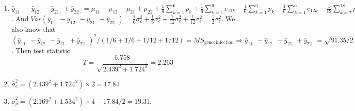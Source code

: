 \documentclass{article}
\begin{document}
\begin{enumerate}[leftmargin = 0 em, label = \arabic*., font = \bfseries]
\begin{enumerate}
		\item 
		$\bar{y}_{11 \cdot} - \bar{y}_{12 \cdot} - \bar{y}_{21 \cdot} + \bar{y}_{22 \cdot} = \mu_{11} - \mu_{12} - \mu_{21} + \mu_{22} + \frac{1}{6} \sum_{k=1}^6 p_k + \frac{1}{6}\sum_{k=1}^6 e_{11k} - \frac{1}{6} \sum_{k=1}^6 p_k - \frac{1}{6} \sum_{k=1}^6 e_{12k} - \frac{1}{12} \sum_{k=7}^{18} p_k - \frac{1}{12} e_{21k} + \frac{1}{12} \sum_{k=7}^18 p_k + \frac{1}{12} \sum_{k=7}^{18} e_{22k} = \mu_{11} - \mu_{12} - \mu_{21} + \mu_{22} + \bar{e}_{11 \cdot} - \bar{e}_{12 \cdot} - \bar{e}_{21 \cdot} + \bar{e}_{22 \cdot}$. And $Var(\bar{y}_{11 \cdot} - \bar{y}_{12 \cdot} - \bar{y}_{21 \cdot} + \bar{y}_{22 \cdot}) = \frac{1}{6} \sigma_e^2 + \frac{1}{6} \sigma_e^2 + \frac{1}{12} \sigma_{e}^2 + \frac{1}{12} \sigma_e^2 = \frac{1}{2} \sigma_e^2$. We also know that $(\bar{y}_{11 \cdot} - \bar{y}_{12 \cdot} - \bar{y}_{21 \cdot} + \bar{y}_{22 \cdot})^2/(1/6 + 1/6 + 1/12 + 1/12) = MS_{\mathrm{geno:infection}} \Rightarrow \bar{y}_{11 \cdot} - \bar{y}_{12 \cdot} - \bar{y}_{21 \cdot} + \bar{y}_{22 \cdot} = \sqrt{91.35/2} = 6.758$. Then test statistic
		\[T = \frac{6.758}{\sqrt{2.439^2 + 1.724^2}} = 2.263\]

		\item 
		$\hat{\sigma}_e^2 = {(2.439^2 + 1.724^2)\times 2} = 17.84$
		\item 
		$\hat{\sigma}_p^2 = (2.169^2 + 1.534^2) \times 4 - 17.84/2 = 19.31$.
	\end{enumerate}
	
	     
\end{enumerate}
	      
\end{document}
